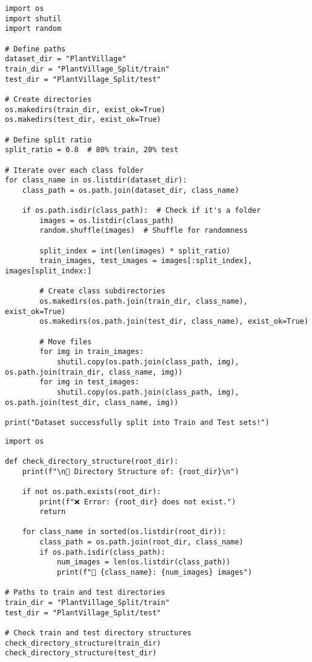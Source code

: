 \documentclass{article}
\begin{document}
\begin{lstlisting}
import os
import shutil
import random

# Define paths
dataset_dir = "PlantVillage"
train_dir = "PlantVillage_Split/train"
test_dir = "PlantVillage_Split/test"

# Create directories
os.makedirs(train_dir, exist_ok=True)
os.makedirs(test_dir, exist_ok=True)

# Define split ratio
split_ratio = 0.8  # 80% train, 20% test

# Iterate over each class folder
for class_name in os.listdir(dataset_dir):
    class_path = os.path.join(dataset_dir, class_name)

    if os.path.isdir(class_path):  # Check if it's a folder
        images = os.listdir(class_path)
        random.shuffle(images)  # Shuffle for randomness

        split_index = int(len(images) * split_ratio)
        train_images, test_images = images[:split_index], images[split_index:]

        # Create class subdirectories
        os.makedirs(os.path.join(train_dir, class_name), exist_ok=True)
        os.makedirs(os.path.join(test_dir, class_name), exist_ok=True)

        # Move files
        for img in train_images:
            shutil.copy(os.path.join(class_path, img), os.path.join(train_dir, class_name, img))
        for img in test_images:
            shutil.copy(os.path.join(class_path, img), os.path.join(test_dir, class_name, img))

print("Dataset successfully split into Train and Test sets!")
\end{lstlisting}
\begin{lstlisting}
import os

def check_directory_structure(root_dir):
    print(f"\n📂 Directory Structure of: {root_dir}\n")

    if not os.path.exists(root_dir):
        print(f"❌ Error: {root_dir} does not exist.")
        return

    for class_name in sorted(os.listdir(root_dir)):
        class_path = os.path.join(root_dir, class_name)
        if os.path.isdir(class_path):
            num_images = len(os.listdir(class_path))
            print(f"📁 {class_name}: {num_images} images")

# Paths to train and test directories
train_dir = "PlantVillage_Split/train"
test_dir = "PlantVillage_Split/test"

# Check train and test directory structures
check_directory_structure(train_dir)
check_directory_structure(test_dir)
\end{lstlisting}
\end{document}
